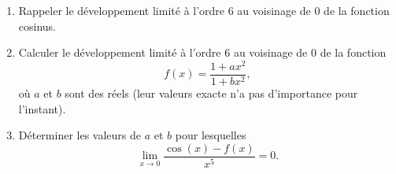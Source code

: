 \begin{exercice}\label{sujetjanvier2016DL}
  
  \begin{enumerate}
  \item Rappeler le développement limité à l'ordre 6  au voisinage de 0 de la fonction cosinus.
  \item Calculer le développement limité à l'ordre 6  au voisinage de 0 de la fonction
    \begin{equation*}
      f(x)=\frac{1+ax^2}{1+bx^2},
    \end{equation*}
    où $a$ et $b$ sont des réels (leur valeurs exacte n'a pas d'importance pour l'instant). 
  \item Déterminer les valeurs de $a$ et $b$ pour lesquelles
    \begin{equation*}
      \lim_{x\to 0} \frac{\cos(x)-f(x)}{x^5} = 0.
    \end{equation*}

  \end{enumerate}
\end{exercice}
